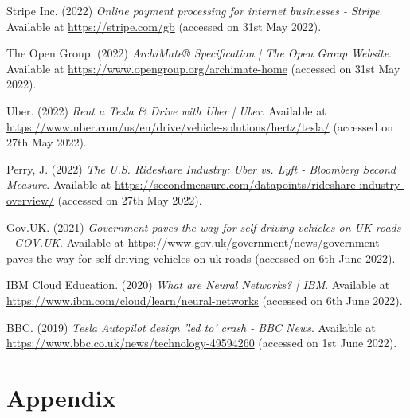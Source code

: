 \documentclass{article}
\begin{document}
    \noindent [3] Stripe Inc. (2022) \textit{Online payment processing for internet businesses - Stripe}. Available at \url{https://stripe.com/gb} (accessed on 31st May 2022).
    \vspace{0.2cm}

    \noindent [4] The Open Group. (2022) \textit{ArchiMate® Specification | The Open Group Website}. Available at \url{https://www.opengroup.org/archimate-home} (accessed on 31st May 2022).
    \vspace{0.2cm}

    \noindent [5] Uber. (2022) \textit{Rent a Tesla \& Drive with Uber | Uber}. Available at \url{https://www.uber.com/us/en/drive/vehicle-solutions/hertz/tesla/} (accessed on 27th May 2022).
    \vspace{0.2cm}

    \noindent [6] Perry, J. (2022) \textit{The U.S. Rideshare Industry: Uber vs. Lyft - Bloomberg Second Measure}. Available at \url{https://secondmeasure.com/datapoints/rideshare-industry-overview/} (accessed on 27th May 2022).
    \vspace{0.2cm}

    \noindent [7] Gov.UK. (2021) \textit{Government paves the way for self-driving vehicles on UK roads - GOV.UK}. Available at \url{https://www.gov.uk/government/news/government-paves-the-way-for-self-driving-vehicles-on-uk-roads} (accessed on 6th June 2022). 
    \vspace{0.2cm}

    \noindent [8] IBM Cloud Education. (2020) \textit{What are Neural Networks?  | IBM}. Available at \url{https://www.ibm.com/cloud/learn/neural-networks} (accessed on  6th June 2022).

    \noindent [9] BBC. (2019) \textit{Tesla Autopilot design 'led to' crash - BBC News}. Available at \url{https://www.bbc.co.uk/news/technology-49594260} (accessed on 1st June 2022).
    \vspace{0.2cm}

    \newpage

    \section{Appendix}
    \label{sec:AppendixA}
\end{document}
